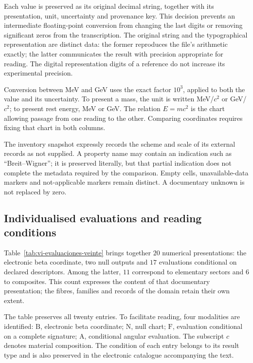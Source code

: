 Each value is preserved as its original decimal string, together with its
presentation, unit, uncertainty and provenance key. This decision
prevents an intermediate floating-point conversion from changing the last
digits or removing significant zeros from the transcription. The original
string and the typographical representation are distinct data: the
former reproduces the file's arithmetic exactly; the
latter communicates the result with precision appropriate for reading.
The digital representation digits of a reference do not increase its
experimental precision.

Conversion between MeV and GeV uses the exact factor \(10^3\), applied
to both the value and its uncertainty. To present a mass, the unit is written
MeV/\(c^2\) or GeV/\(c^2\); to present rest energy,
MeV or GeV. The relation \(E=mc^2\) is the chart allowing passage from one
reading to the other. Comparing coordinates requires fixing that chart in
both columns.

The inventory snapshot expressly records the scheme and scale of its external
records as not supplied. A property name
may contain an indication such as “Breit--Wigner”; it is preserved literally,
but that partial indication does not complete the metadata required by the comparison.
Empty cells, unavailable-data markers and
not-applicable markers remain distinct. A documentary unknown
is not replaced by zero.

\subsection{Individualised evaluations and reading conditions}
\label{subsec:vi-evaluaciones-documentadas}

Table~\ref{tab:vi-evaluaciones-veinte} brings together \(20\) numerical
presentations: the electronic beta coordinate, two null outputs and
\(17\) evaluations conditional on declared descriptors. Among
the latter, \(11\) correspond to elementary sectors and \(6\) to
composites. This count expresses the content of that documentary presentation;
the fibres, families and records of the domain retain their own extent.

The table preserves all twenty entries. To facilitate reading,
four modalities are identified: \(\mathrm{B}\), electronic beta
coordinate; \(\mathrm{N}\), null chart; \(\mathrm{F}\), evaluation
conditional on a complete signature; \(\mathrm{A}\), conditional angular
evaluation. The subscript \(c\) denotes material composition. The
condition of each entry belongs to its result type and is also preserved
in the electronic catalogue accompanying the text.

